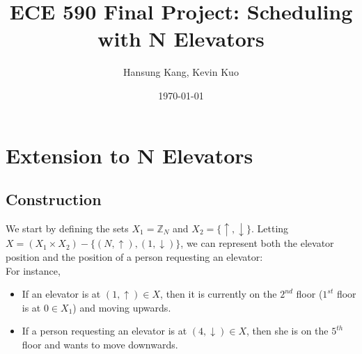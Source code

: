 \documentclass[letterpaper]{article} %
\begin{document}
\title{ECE 590 Final Project: Scheduling with N Elevators}
\author{Hansung Kang, Kevin Kuo}
\date{\today}
\maketitle

\section{Extension to N Elevators}
\subsection{Construction}
We start by defining the sets $X_1 = \mathbb{Z}_N$ and $X_2 = \{\uparrow, \downarrow\}$. Letting $X = (X_1 \times X_2) - \{(N, \uparrow), (1, \downarrow)\}$, we can represent both the elevator position and the position of a person requesting an elevator:\\

For instance, 
\begin{itemize}
	\item If an elevator is at $(1, \uparrow) \in X$, then it is currently on the $2^{nd}$ floor ($1^{st}$ floor is at $0 \in X_1$) and moving upwards.
	\item If a person requesting an elevator is at $(4, \downarrow) \in X$, then she is on the $5^{th}$ floor and wants to move downwards. 
\end{itemize}
\end{document}

